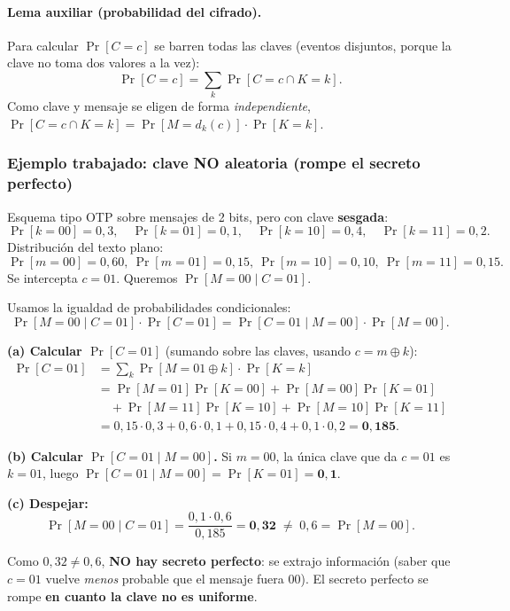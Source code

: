 \documentclass[../main.tex]{subfiles}
\begin{document}
\paragraph{Lema auxiliar (probabilidad del cifrado).}
Para calcular $\Pr[C=c]$ se barren todas las claves (eventos disjuntos, porque
la clave no toma dos valores a la vez):
$$\Pr[C=c] = \sum_{k} \Pr[C=c \cap K=k].$$
Como clave y mensaje se eligen de forma \emph{independiente},
$\Pr[C=c\cap K=k]=\Pr[M = d_k(c)]\cdot \Pr[K=k]$.

\subsubsection{Ejemplo trabajado: clave NO aleatoria (rompe el secreto perfecto)}

Esquema tipo OTP sobre mensajes de 2 bits, pero con clave \textbf{sesgada}:
$$\Pr[k{=}00]{=}0{,}3,\quad \Pr[k{=}01]{=}0{,}1,\quad \Pr[k{=}10]{=}0{,}4,\quad \Pr[k{=}11]{=}0{,}2.$$
Distribución del texto plano:
$$\Pr[m{=}00]{=}0{,}60,\ \Pr[m{=}01]{=}0{,}15,\ \Pr[m{=}10]{=}0{,}10,\ \Pr[m{=}11]{=}0{,}15.$$
Se intercepta $c=01$. Queremos $\Pr[M{=}00 \mid C{=}01]$.

Usamos la igualdad de probabilidades condicionales:
$$\Pr[M{=}00\mid C{=}01]\cdot \Pr[C{=}01] = \Pr[C{=}01\mid M{=}00]\cdot \Pr[M{=}00].$$

\textbf{(a) Calcular $\Pr[C{=}01]$} (sumando sobre las claves, usando $c=m\oplus k$):
\begin{align*}
\Pr[C{=}01] &= \sum_k \Pr[M{=}01\oplus k]\cdot\Pr[K{=}k]\\
&= \Pr[M{=}01]\Pr[K{=}00] + \Pr[M{=}00]\Pr[K{=}01]\\
&\quad + \Pr[M{=}11]\Pr[K{=}10] + \Pr[M{=}10]\Pr[K{=}11]\\
&= 0{,}15\cdot0{,}3 + 0{,}6\cdot0{,}1 + 0{,}15\cdot0{,}4 + 0{,}1\cdot0{,}2 = \mathbf{0{,}185}.
\end{align*}

\textbf{(b) Calcular $\Pr[C{=}01\mid M{=}00]$.} Si $m=00$, la única clave que da
$c=01$ es $k=01$, luego $\Pr[C{=}01\mid M{=}00]=\Pr[K{=}01]=\mathbf{0{,}1}$.

\textbf{(c) Despejar:}
$$\Pr[M{=}00\mid C{=}01] = \frac{0{,}1\cdot 0{,}6}{0{,}185} = \mathbf{0{,}32} \;\neq\; 0{,}6 = \Pr[M{=}00].$$

\begin{ojo}
Como $0{,}32 \neq 0{,}6$, \textbf{NO hay secreto perfecto}: se extrajo
información (saber que $c=01$ vuelve \emph{menos} probable que el mensaje fuera
$00$). El secreto perfecto se rompe \textbf{en cuanto la clave no es uniforme}.
\end{ojo}
\end{document}
